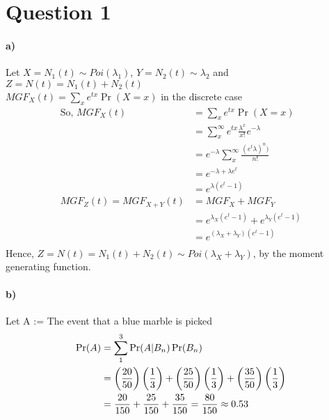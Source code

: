 \documentclass[letterpaper,12pt,titlepage,oneside,final]{book}
\begin{document}





\section*{Question 1}
\paragraph{a)}
\indent Let $X = N_1(t) \sim Poi(\lambda_1)$, $Y = N_2(t)\sim \lambda_2$ and $Z =  N(t) = N_1(t) + N_2(t)$\\
\indent $MGF_{X}(t) = \sum_x e^{tx}\Pr(X=x)$  in the discrete case\\
\begin{align*}
\text{So, }  MGF_{X}(t) &= \sum_x e^{tx}\Pr(X=x)\\
&=\sum_x^{\infty} e^{tx}\frac{\lambda^x}{x!}e^{-\lambda}\\
&=e^{-\lambda}\sum_x^{\infty}\frac{(e^t\lambda)^n)}{n!}\\
&=e^{-\lambda + \lambda e^t}\\
&=e^{\lambda(e^t -1)}\\
MGF_Z(t) =MGF_{X+Y}(t) &= MGF_{X}+ MGF_{Y} \\
& = e^{\lambda_{X}(e^t -1)} + e^{\lambda_{Y}(e^t -1)}\\
& = e^{(\lambda_{X}+\lambda_{Y})(e^t -1)}\\
\end{align*}
\indent Hence,  $Z = N(t) = N_1(t) + N_2(t) \sim Poi(\lambda_{X}+\lambda_{Y})$, by the moment generating function.

\paragraph{b)}
\indent Let A := The event that a blue marble is picked
\begin{align*}
\Pr(A) &=  \sum_1^3 \Pr(A|B_n)\Pr(B_n)\\
& = \left(\frac{20}{50}\right)\left(\frac{1}{3}\right)+\left(\frac{25}{50}\right)\left(\frac{1}{3}\right)+\left(\frac{35}{50}\right)\left(\frac{1}{3}\right)\\
& = \frac{20}{150} + \frac{25}{150} + \frac{35}{150} = \frac{80}{150}\approx 0.53
\bigskip
\end{align*}
\end{document}
